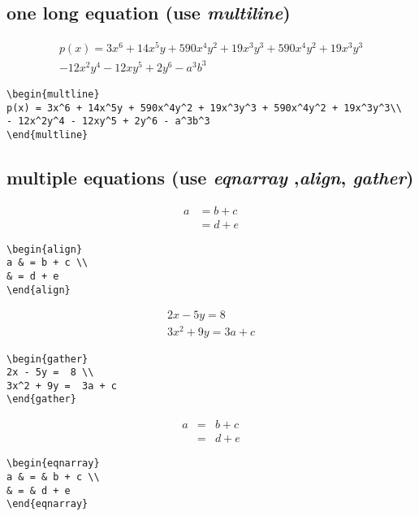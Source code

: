 \documentclass[12pt]{article}
\begin{document}
\subsection{one long equation (use \textit{multiline})}
\begin{multline}
p(x) = 3x^6 + 14x^5y + 590x^4y^2 + 19x^3y^3 + 590x^4y^2 + 19x^3y^3\\ 
- 12x^2y^4 - 12xy^5 + 2y^6 - a^3b^3
\end{multline}

\begin{lstlisting}
\begin{multline}
p(x) = 3x^6 + 14x^5y + 590x^4y^2 + 19x^3y^3 + 590x^4y^2 + 19x^3y^3\\ 
- 12x^2y^4 - 12xy^5 + 2y^6 - a^3b^3
\end{multline}
\end{lstlisting}

\subsection{multiple equations (use \textit{eqnarray} ,\textit{align}, \textit{gather})}

\begin{align}
a & = b + c \\
& = d + e
\end{align}

\begin{lstlisting}
\begin{align}
a & = b + c \\
& = d + e
\end{align}
\end{lstlisting}

\begin{gather*} 
2x - 5y =  8 \\ 
3x^2 + 9y =  3a + c
\end{gather*}

\begin{lstlisting}
\begin{gather} 
2x - 5y =  8 \\ 
3x^2 + 9y =  3a + c
\end{gather}
\end{lstlisting}

\begin{eqnarray}
a & = & b + c \\
& = & d + e
\label{eq:faultyeqnarray}
\end{eqnarray}

\begin{lstlisting}
\begin{eqnarray}
a & = & b + c \\
& = & d + e
\end{eqnarray}
\end{lstlisting}
\end{document}
